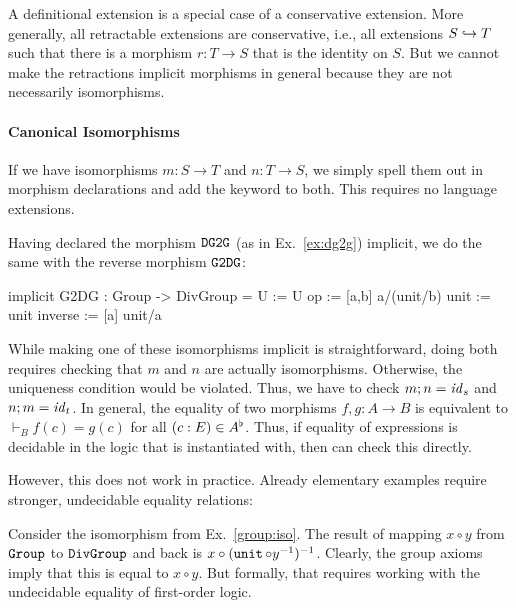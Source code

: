 \begin{remark}
A definitional extension is a special case of a conservative extension.
More generally, all retractable extensions are conservative, i.e., all extensions $S\hookrightarrow T$ such that there is a morphism $r:T\to S$ that is the identity on $S$.
But we cannot make the retractions implicit morphisms in general because they are not necessarily isomorphisms.
\end{remark}

\paragraph{Canonical Isomorphisms}
If we have isomorphisms $m:S\to T$ and $n:T\to S$, we simply spell them out in morphism declarations and add the keyword  to both.
This requires no language extensions.

\begin{example}\label{group:iso}
Having declared the morphism $\operatorname{\mathtt{DG2G}}$ (as in Ex.~\ref{ex:dg2g}) implicit, we do the same with the reverse morphism  $\operatorname{\mathtt{G2DG}}$:
\begin{mmtcode}
implicit G2DG : Group -> DivGroup =
  U       := U
  op      := [a,b] a/(unit/b) 
  unit    := unit
  inverse := [a] unit/a
\end{mmtcode}
\end{example}

While making one of these isomorphisms implicit is straightforward, doing both requires checking that $m$ and $n$ are actually isomorphisms.
Otherwise, the uniqueness condition would be violated.
Thus, we have to check $m;n=\mathit{id}_{s}$ and $n;m=\mathit{id}_{t}$.
In general, the equality of two morphisms $f,g:A\to B$ is equivalent to $\vdash_B f(c)=g(c)$ for all $(c:E)\in A^\flat$.
Thus, if equality of expressions is decidable in the logic that \mmt is instantiated with, then \mmt can check this directly.

However, this does not work in practice.
Already elementary examples require stronger, undecidable equality relations:

\begin{example}
Consider the isomorphism from Ex.~\ref{group:iso}.
The result of mapping $x\circ y$ from $\operatorname{\mathtt{Group}}$ to $\operatorname{\mathtt{DivGroup}}$ and back is $x\circ(\operatorname{\mathtt{unit}}\circ y^{-1})^{-1}$.
Clearly, the group axioms imply that this is equal to $x\circ y$.
But formally, that requires working with the undecidable equality of first-order logic.
\end{example}

